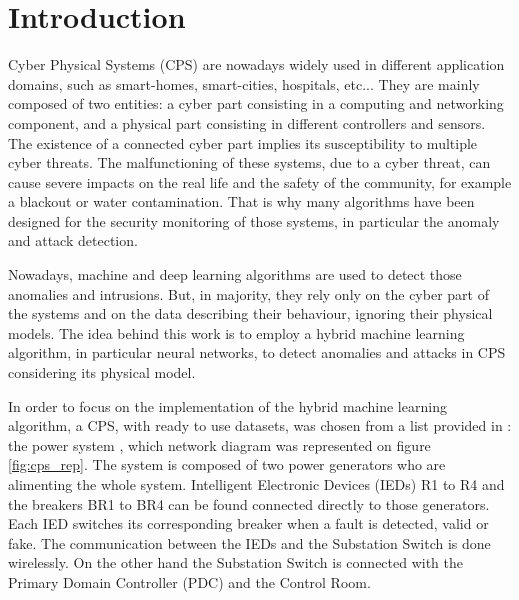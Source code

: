 \chapter{Introduction} \label{chap:intro}

Cyber Physical Systems (CPS) are nowadays widely used in different application domains, such as smart-homes, smart-cities, hospitals, etc... They are mainly composed of two entities: a cyber part consisting in a computing and networking component, and a physical part consisting in different controllers and sensors. The existence of a connected cyber part implies its susceptibility to multiple cyber threats. The malfunctioning of these systems, due to a cyber threat, can cause severe impacts on the real life and the safety of the community, for example a blackout or water contamination. That is why many algorithms have been designed for the security monitoring of those systems, in particular the anomaly and attack detection.

Nowadays, machine and deep learning algorithms are used to detect those anomalies and intrusions. But, in majority, they rely only on the cyber part of the systems and on the data describing their behaviour, ignoring their physical models. The idea behind this work is to employ a hybrid machine learning algorithm, in particular neural networks, to detect anomalies and attacks in CPS considering its physical model.

In order to focus on the implementation of the hybrid machine learning algorithm, a CPS, with ready to use datasets, was chosen from a list provided in \cite{morris_industrial_nodate}: the power system \cite{adhikari_power_2014}, which network diagram was represented on figure \ref{fig:cps_rep}. The system is composed of two power generators who are alimenting the whole system. Intelligent Electronic Devices (IEDs) R1 to R4 and the breakers BR1 to BR4 can be found connected directly to those generators. Each IED switches its corresponding breaker when a fault is detected, valid or fake. The communication between the IEDs and the Substation Switch is done wirelessly. On the other hand the Substation Switch is connected with the Primary Domain Controller (PDC) and the Control Room.

